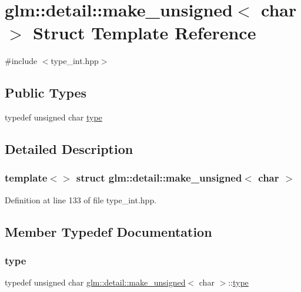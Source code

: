 \hypertarget{structglm_1_1detail_1_1make__unsigned_3_01char_01_4}{}\section{glm\+::detail\+::make\+\_\+unsigned$<$ char $>$ Struct Template Reference}
\label{structglm_1_1detail_1_1make__unsigned_3_01char_01_4}


{\ttfamily \#include $<$type\+\_\+int.\+hpp$>$}

\subsection*{Public Types}
\begin{DoxyCompactItemize}
\item 
typedef unsigned char \mbox{\hyperlink{structglm_1_1detail_1_1make__unsigned_3_01char_01_4_a473f89289be25f14bdc7c459e4be4fed}{type}}
\end{DoxyCompactItemize}


\subsection{Detailed Description}
\subsubsection*{template$<$$>$\newline
struct glm\+::detail\+::make\+\_\+unsigned$<$ char $>$}



Definition at line 133 of file type\+\_\+int.\+hpp.



\subsection{Member Typedef Documentation}
\mbox{\label{structglm_1_1detail_1_1make__unsigned_3_01char_01_4_a473f89289be25f14bdc7c459e4be4fed}} 
\subsubsection{\texorpdfstring{type}{type}}
{\footnotesize\ttfamily typedef unsigned char \mbox{\hyperlink{structglm_1_1detail_1_1make__unsigned}{glm\+::detail\+::make\+\_\+unsigned}}$<$ char $>$\+::\mbox{\hyperlink{structglm_1_1detail_1_1make__unsigned_3_01char_01_4_a473f89289be25f14bdc7c459e4be4fed}{type}}}



